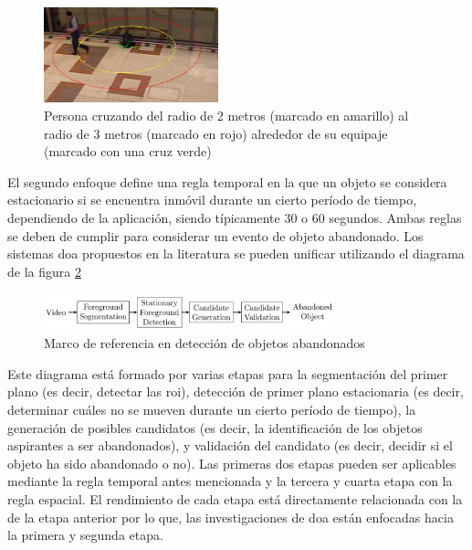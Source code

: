 \begin{figure}[ht]
\centering
\includegraphics[width=0.45\textwidth]{img/chapters/introduccion/pets2006-3m.jpeg}
\caption{\label{fig:pets2006-3m}Persona cruzando del radio de 2 metros (marcado en amarillo) al radio de 3 metros (marcado en rojo) alrededor de su equipaje (marcado con una cruz verde) \cite{7789647}}
\end{figure}

El segundo enfoque define una regla temporal en la que un objeto se considera estacionario si se encuentra inmóvil durante un cierto período de tiempo, dependiendo de la aplicación, siendo típicamente 30 o 60 segundos. Ambas reglas se deben de cumplir para considerar un evento de objeto abandonado. Los sistemas \gls{doa} propuestos en la literatura se pueden unificar utilizando el diagrama de la figura \ref{fig:canonical-framework-aod}

\begin{figure}[ht]
\centering
\includegraphics[width=0.75\textwidth]{img/chapters/introduccion/canonical-framework-aod.png}
\caption{\label{fig:canonical-framework-aod}Marco de referencia en detección de objetos abandonados \cite{luna2018}}
\end{figure}

Este diagrama está formado por varias etapas para la segmentación del primer plano (es decir, detectar las \gls{roi}), detección de primer plano estacionaria (es decir, determinar cuáles no se mueven durante un cierto período de tiempo), la generación de posibles candidatos (es decir, la identificación de los objetos aspirantes a ser abandonados), y validación del candidato (es decir, decidir si el objeto ha sido abandonado o no). Las primeras dos etapas pueden ser aplicables mediante la regla temporal antes mencionada y la tercera y cuarta etapa con la regla espacial. El rendimiento de cada etapa está directamente relacionada con la de la etapa anterior por lo que, las investigaciones de \gls{doa} están enfocadas hacia la primera y segunda etapa.

